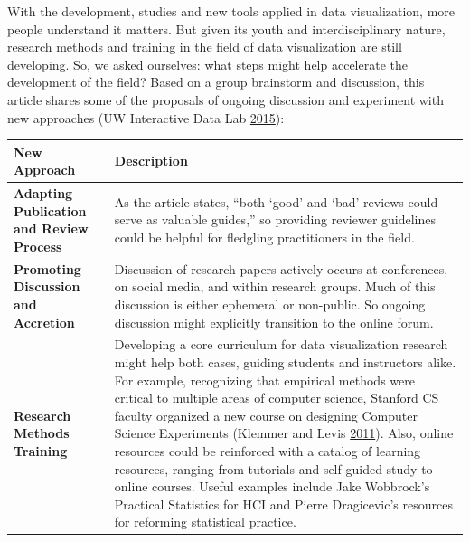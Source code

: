 \documentclass[]{book}
\begin{document}
With the development, studies and new tools applied in data visualization, more people understand it matters. But given its youth and interdisciplinary nature, research methods and training in the field of data visualization are still developing. So, we asked ourselves: what steps might help accelerate the development of the field? Based on a group brainstorm and discussion, this article shares some of the proposals of ongoing discussion and experiment with new approaches (UW Interactive Data Lab \protect\hyperlink{ref-Next_Steps}{2015}):

\begin{longtable}[]{@{}ll@{}}
\toprule
\begin{minipage}[b]{0.25\columnwidth}\raggedright
\textbf{New Approach}\strut
\end{minipage} & \begin{minipage}[b]{0.69\columnwidth}\raggedright
\textbf{Description}\strut
\end{minipage}\tabularnewline
\midrule
\endhead
\begin{minipage}[t]{0.25\columnwidth}\raggedright
\textbf{Adapting Publication and Review Process}\strut
\end{minipage} & \begin{minipage}[t]{0.69\columnwidth}\raggedright
As the article states, ``both `good' and `bad' reviews could serve as valuable guides,'' so providing reviewer guidelines could be helpful for fledgling practitioners in the field.\strut
\end{minipage}\tabularnewline
\begin{minipage}[t]{0.25\columnwidth}\raggedright
\textbf{Promoting Discussion and Accretion}\strut
\end{minipage} & \begin{minipage}[t]{0.69\columnwidth}\raggedright
Discussion of research papers actively occurs at conferences, on social media, and within research groups. Much of this discussion is either ephemeral or non-public. So ongoing discussion might explicitly transition to the online forum.\strut
\end{minipage}\tabularnewline
\begin{minipage}[t]{0.25\columnwidth}\raggedright
\textbf{Research Methods Training}\strut
\end{minipage} & \begin{minipage}[t]{0.69\columnwidth}\raggedright
Developing a core curriculum for data visualization research might help both cases, guiding students and instructors alike. For example, recognizing that empirical methods were critical to multiple areas of computer science, Stanford CS faculty organized a new course on designing Computer Science Experiments (Klemmer and Levis \protect\hyperlink{ref-stanford_course}{2011}). Also, online resources could be reinforced with a catalog of learning resources, ranging from tutorials and self-guided study to online courses. Useful examples include Jake Wobbrock's Practical Statistics for HCI and Pierre Dragicevic's resources for reforming statistical practice.\strut
\end{minipage}\tabularnewline
\bottomrule
\end{longtable}
\end{document}
